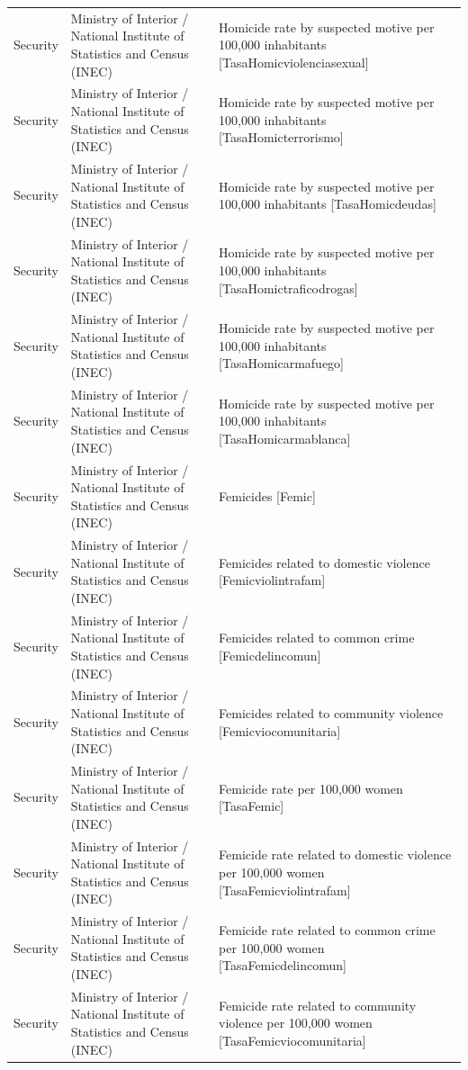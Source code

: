 \documentclass[10pt,a4paper]{article}
\begin{document}
\begin{longtable}{@{}>{\raggedright\arraybackslash}p{3.5cm}>{\raggedright\arraybackslash}p{5.6cm}>{\raggedright\arraybackslash}p{\dimexpr\textwidth-9.1cm-4\tabcolsep\relax}@{}}
Security & Ministry of Interior / National Institute of Statistics and Census (INEC) & Homicide rate by suspected motive per 100,000 inhabitants [TasaHomicviolenciasexual]\\
Security & Ministry of Interior / National Institute of Statistics and Census (INEC) & Homicide rate by suspected motive per 100,000 inhabitants [TasaHomicterrorismo]\\
Security & Ministry of Interior / National Institute of Statistics and Census (INEC) & Homicide rate by suspected motive per 100,000 inhabitants [TasaHomicdeudas]\\
Security & Ministry of Interior / National Institute of Statistics and Census (INEC) & Homicide rate by suspected motive per 100,000 inhabitants [TasaHomictraficodrogas]\\
Security & Ministry of Interior / National Institute of Statistics and Census (INEC) & Homicide rate by suspected motive per 100,000 inhabitants [TasaHomicarmafuego]\\
Security & Ministry of Interior / National Institute of Statistics and Census (INEC) & Homicide rate by suspected motive per 100,000 inhabitants [TasaHomicarmablanca]\\
Security & Ministry of Interior / National Institute of Statistics and Census (INEC) & Femicides [Femic]\\
Security & Ministry of Interior / National Institute of Statistics and Census (INEC) & Femicides related to domestic violence [Femicviolintrafam]\\
Security & Ministry of Interior / National Institute of Statistics and Census (INEC) & Femicides related to common crime [Femicdelincomun]\\
Security & Ministry of Interior / National Institute of Statistics and Census (INEC) & Femicides related to community violence [Femicviocomunitaria]\\
Security & Ministry of Interior / National Institute of Statistics and Census (INEC) & Femicide rate per 100,000 women [TasaFemic]\\
Security & Ministry of Interior / National Institute of Statistics and Census (INEC) & Femicide rate related to domestic violence per 100,000 women [TasaFemicviolintrafam]\\
Security & Ministry of Interior / National Institute of Statistics and Census (INEC) & Femicide rate related to common crime per 100,000 women [TasaFemicdelincomun]\\
Security & Ministry of Interior / National Institute of Statistics and Census (INEC) & Femicide rate related to community violence per 100,000 women [TasaFemicviocomunitaria]\\

\end{longtable}
\end{document}
